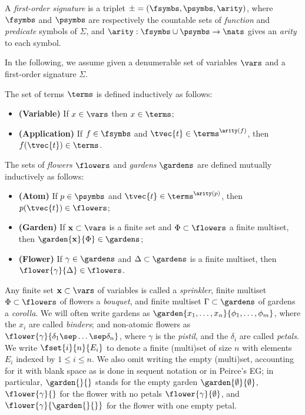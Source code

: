 
\begin{definition}
  A \emph{first-order signature} is a triplet $\mathcal{\Sigma} = (
  \fsymbs, \psymbs, \arity )$, where $\fsymbs$ and $\psymbs$ are
  respectively the countable sets of \emph{function} and \emph{predicate}
  symbols of $\Sigma$, and $\arity : \fsymbs \cup \psymbs \to \nats$ gives an
  \emph{arity} to each symbol.
\end{definition}

In the following, we assume given a denumerable set of variables $\vars$
and a first-order signature $\Sigma$.

\begin{definition}[Terms]
  The set of terms $\terms$ is defined inductively as follows:
  \begin{itemize}
    \item{\textbf{(Variable)}} If $x \in \vars$ then $x \in \terms$;
    \item{\textbf{(Application)}} If $f \in \fsymbs$ and $\tvec{t}
    \in \terms^{\arity(f)}$, then $f(\tvec{t}) \in \terms$.
  \end{itemize}
\end{definition}

\begin{definition}[Flowers]
  The sets of \emph{flowers} $\flowers$ and \emph{gardens} $\gardens$ are
  defined mutually inductively as follows:
  \begin{itemize}
    \item{\textbf{(Atom)}} If $p \in \psymbs$ and $\tvec{t} \in
    \terms^{\arity(p)}$, then $p(\tvec{t}) \in \flowers$;
    \item{\textbf{(Garden)}} If $\mathbf{x} \subset \vars$ is a finite set and $\Phi
    \subset \flowers$ a finite multiset, then $\garden{\mathbf{x}}{\Phi} \in
    \gardens$;
    \item{\textbf{(Flower)}} If $\gamma \in \gardens$ and $\Delta \subset \gardens$
    is a finite multiset, then $\flower{\gamma}{\Delta} \in \flowers$.
  \end{itemize}
\end{definition}

Any finite set $\mathbf{x} \subset \vars$ of variables is called a
\emph{sprinkler}, finite multiset $\Phi \subset \flowers$ of flowers a
\emph{bouquet}, and finite multiset $\Gamma \subset \gardens$ of gardens a
\emph{corolla}. We will often write gardens as $\garden{x_1, \ldots,
x_n}{\phi_1, \ldots, \phi_m}$, where the $x_i$ are called \emph{binders}; and
non-atomic flowers as $\flower{\gamma}{\delta_1 \sep \ldots \sep \delta_n}$,
where $\gamma$ is the \emph{pistil}, and the $\delta_i$ are called
\emph{petals}. We write $\fset{i}{n}{E_i}$ to denote a finite (multi)set of
size $n$ with elements $E_i$ indexed by $1 \leq i \leq n$. We also omit
writing the empty (multi)set, accounting for it with blank space as is done in
sequent notation or in Peirce's EG; in particular, $\garden{{}}{{}}$ stands for
the empty garden $\garden{\emptyset}{\emptyset}$, $\flower{\gamma}{{}}$ for the
flower with no petals $\flower{\gamma}{\emptyset}$, and
$\flower{\gamma}{\garden{{}}{{}}}$ for the flower with one empty petal.


